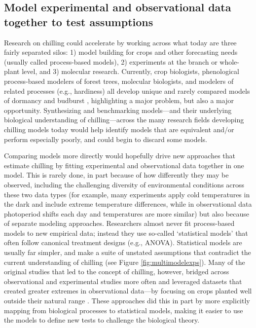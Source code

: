 \documentclass[11pt]{article}
\begin{document}
\subsection*{Model experimental and observational data together to test assumptions} 
Research on chilling could accelerate by working across what today are three fairly separated silos: 1) model building for crops and other forecasting needs (usually called process-based models), 2) experiments at the branch or whole-plant level, and 3) molecular research. Currently, crop biologists, phenological process-based modelers of forest trees, molecular biologists, and modelers of related processes (e.g., hardiness) 
all develop unique and rarely compared models of dormancy and budburst \citep[but see][]{kovaleskipreprint}, highlighting a major problem, but also a major opportunity. Synthesizing and benchmarking models---and their underlying biological understanding of chilling---across the many research fields developing chilling models today would help identify models that are equivalent and/or perform especially poorly, and could begin to discard some models.  %

Comparing models more directly would hopefully drive new approaches that estimate chilling by fitting experimental and observational data together in one model. This is rarely done, in part because of how differently they may be observed, including the challenging diversity of environmental conditions across these two data types (for example, many experiments apply cold temperatures in the dark and include extreme temperature differences, while in observational data photoperiod shifts each day and temperatures are more similar) but also because of separate modeling approaches. Researchers almost never fit process-based models to new empirical data; instead they use so-called `statistical models' that often follow canonical treatment designs (e.g., ANOVA). Statistical models are usually far simpler, and make a suite of unstated assumptions that contradict the current understanding of chilling 
(see Figure \ref{fig:multimodelexps}). Many of the original studies that led to the concept of chilling, however, bridged across observational and experimental studies more often and leveraged datasets that created greater extremes in observational data---by focusing on crops planted well outside their natural range \citep[e.g., peaches in Florida and Israel, ][]{erez1971,richardson1974}. These approaches did this in part by more explicitly mapping from biological processes to statistical models, making it easier to use the models to define new tests to challenge the biological theory. %
\end{document}
